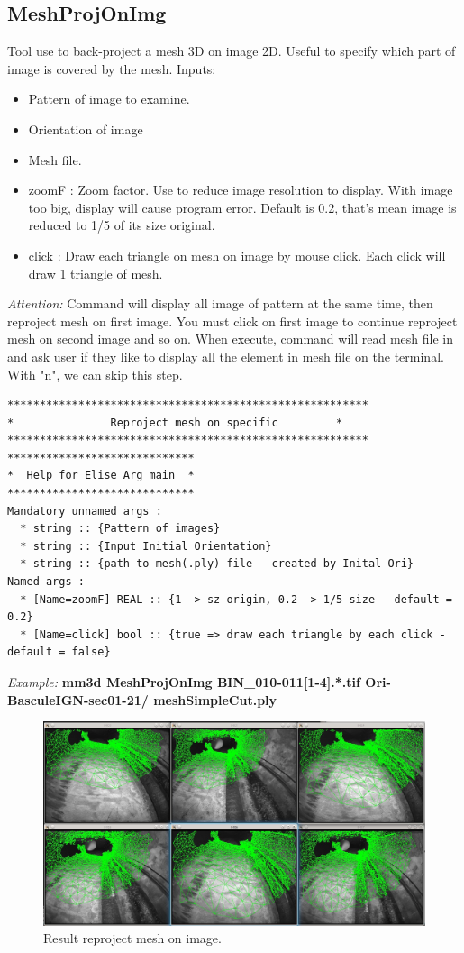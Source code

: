 \subsection{MeshProjOnImg}
Tool use to back-project a mesh 3D on image 2D. Useful to specify which part of image is covered by the mesh.
Inputs:
\begin{itemize}
\item Pattern of image to examine.
\item Orientation of image
\item Mesh file.

\item zoomF : Zoom factor. Use to reduce image resolution to display. With image too big, display will cause program error. Default is 0.2, that's mean image is reduced to 1/5 of its size original.
\item click : Draw each triangle on mesh on image by mouse click. Each click will draw 1 triangle of mesh.
\end{itemize}
\textit{Attention:} Command will display all image of pattern at the same time, then reproject mesh on first image. You must click on first image to continue reproject mesh on second image and so on. When execute, command will read mesh file in and ask user if they like to display all the element in mesh file on the terminal. With "n", we can skip this step.

\begin{verbatim}
********************************************************
*               Reproject mesh on specific 	       *
********************************************************
*****************************
*  Help for Elise Arg main  *
*****************************
Mandatory unnamed args : 
  * string :: {Pattern of images}
  * string :: {Input Initial Orientation}
  * string :: {path to mesh(.ply) file - created by Inital Ori}
Named args : 
  * [Name=zoomF] REAL :: {1 -> sz origin, 0.2 -> 1/5 size - default = 0.2}
  * [Name=click] bool :: {true => draw each triangle by each click - default = false}
\end{verbatim}
\textit{Example:}
\textbf{mm3d MeshProjOnImg BIN\_010-011[1-4].*.tif Ori-BasculeIGN-sec01-21/ meshSimpleCut.ply}

\begin{figure}[H]
\centering
\includegraphics[width=15cm]{FIGS/MeshProjOnImg/meshOnImg.jpeg}
\caption{Result reproject mesh on image.}
\label{SurfCorr}
\end{figure}

